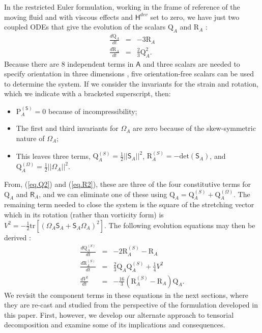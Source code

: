 \documentclass[preprint,amssymb,amsmath,aip,cha]{revtex4-1}
\begin{document}
In the restricted Euler formulation, working in the frame of reference of the moving fluid  and with viscous effects and $\mathsf{H}^{dev}$ set to zero, we have just two coupled ODEs that give the evolution of the scalars $\mbox{Q}_{A}$ and $\mbox{R}_{A}$ \citep{cantwell92}:
\begin{eqnarray}
\label{eq.QEuler}
\frac{d \mbox{Q}_{A}}{d t} &=& -3 \mbox{R}_{A} \\
\frac{d \mbox{R}_{A}}{d t} &=& \frac{2}{3} \mbox{Q}_{A}^{2}.
\label{eq.REuler}
\end{eqnarray}
Because there are 8 independent terms in $\mathsf{A}$ and three scalars are needed to specify orientation in three dimensions \citep{meneveau11}, five orientation-free scalars can be used to determine the system. If we consider the invariants for the strain and rotation, which we indicate with a bracketed superscript, then:
\begin{itemize}
\item $\mbox{P}_{A}^{(\mathsf{S})} = 0$ because of incompressibility;
\item The first and third invariants for $\mathsf{\Omega}_{A}$ are zero because of the skew-symmetric nature of $\mathsf{\Omega}_{A}$;
\item This leaves three terms, $\mbox{Q}_{A}^{({S})} = \frac{1}{2} ||\mathsf{S}_{A}||^{2}$, $\mbox{R}_{A}^{({S})} = - \mbox{det}(\mathsf{S}_{A})$, and $\mbox{Q}_{A}^{({\Omega})} = \frac{1}{2} ||\mathsf{\Omega}_{A}||^{2}$. 
\end{itemize}
From, (\ref{eq.Q2}) and (\ref{eq.R2}), these are three of the four constitutive terms for $\mbox{Q}_{A}$ and $\mathsf{R}_{A}$, and we can eliminate one of these using $\mbox{Q}_{A} = \mbox{Q}_{A}^{({S})} + \mbox{Q}_{A}^{({\Omega})}$. The remaining term needed to close the system is the square of the stretching vector which in its rotation (rather than vorticity form) is $V^{2} = -\frac{1}{2}\mbox{tr}[(\mathsf{\Omega}_{A}\mathsf{S}_{A}+\mathsf{S}_{A}\mathsf{\Omega}_{A})^{2}]$. The following evolution equations may then be derived \citep{martin98}:
\begin{eqnarray}
\label{eq.ExtendedEuler1}
\frac{d \mbox{Q}_{A}^{(S)}}{d t} &=& -2 \mbox{R}_{A}^{(S)} - \mbox{R}_{A} \\
\label{eq.ExtendedEuler2}
\frac{d \mbox{R}_{A}^{(S)}}{d t} &=& \frac{2}{3}  \mbox{Q}_{A}\mbox{Q}_{A}^{(S)} + \frac{1}{4}V^{2} \\
\frac{d V^{2}}{d t} &=& -\frac{16}{3} ( \mbox{R}_{A}^{(S)} - \mbox{R}_{A} ) \mbox{Q}_{A}.
\label{eq.ExtendedEuler3}
\end{eqnarray}
We revisit the component terms in these equations in the next sections, where they are re-cast and studied from the perspective of the formulation developed in this paper. First, however, we develop our alternate approach to tensorial decomposition and examine some of its implications and consequences.
 
\end{document}
